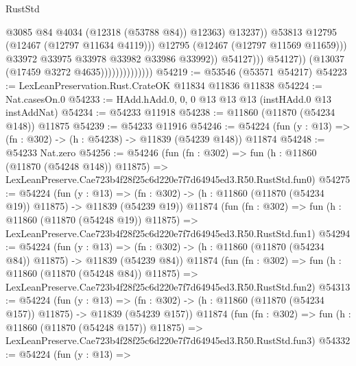 \begin{lexlean}{RustStd}
\begin{coremodule}
                                                    @3085
                                                    @84
                                                    @4034
                                                    (@12318 (@53788 @84))
                                                    @12363)
                                                  @13237))
                                              @53813
                                              @12795
                                              (@12467 (@12797 @11634 @4119)))
                                            @12795
                                            (@12467 (@12797 @11569 @11659)))
                                          @33972
                                          @33975
                                          @33978
                                          @33982
                                          @33986
                                          @33992))
                                      @54127)))
                                @54127))
                            (@13037 (@17459 @3272 @4635))))))))))))))
@54219 := @53546 (@53571 @54217)
@54223 := LexLeanPreservation.Rust.CrateOK @11834 @11836 @11838
@54224 := Nat.casesOn.{0}
@54233 := HAdd.hAdd.{0, 0, 0} @13 @13 @13 (instHAdd.{0} @13 instAddNat)
@54234 := @54233 @11918
@54238 := @11860 (@11870 (@54234 @148)) @11875
@54239 := @54233 @11916
@54246 := @54224 (fun (y : @13) => (fn : @302) -> (h : @54238) -> @11839 (@54239 @148)) @11874
@54248 := @54233 Nat.zero
@54256 := @54246
    (fun (fn : @302) =>
    fun (h : @11860 (@11870 (@54248 @148)) @11875) =>
    LexLeanPreserve.Cae723b4f28f25c6d220e7f7d64945ed3.R50.RustStd.fun0)
@54275 := @54224
    (fun (y : @13) =>
    (fn : @302) -> (h : @11860 (@11870 (@54234 @19)) @11875) -> @11839 (@54239 @19))
    @11874
    (fun (fn : @302) =>
    fun (h : @11860 (@11870 (@54248 @19)) @11875) =>
    LexLeanPreserve.Cae723b4f28f25c6d220e7f7d64945ed3.R50.RustStd.fun1)
@54294 := @54224
    (fun (y : @13) =>
    (fn : @302) -> (h : @11860 (@11870 (@54234 @84)) @11875) -> @11839 (@54239 @84))
    @11874
    (fun (fn : @302) =>
    fun (h : @11860 (@11870 (@54248 @84)) @11875) =>
    LexLeanPreserve.Cae723b4f28f25c6d220e7f7d64945ed3.R50.RustStd.fun2)
@54313 := @54224
    (fun (y : @13) =>
    (fn : @302) -> (h : @11860 (@11870 (@54234 @157)) @11875) -> @11839 (@54239 @157))
    @11874
    (fun (fn : @302) =>
    fun (h : @11860 (@11870 (@54248 @157)) @11875) =>
    LexLeanPreserve.Cae723b4f28f25c6d220e7f7d64945ed3.R50.RustStd.fun3)
@54332 := @54224
    (fun (y : @13) =>

\end{coremodule}
\end{lexlean}
